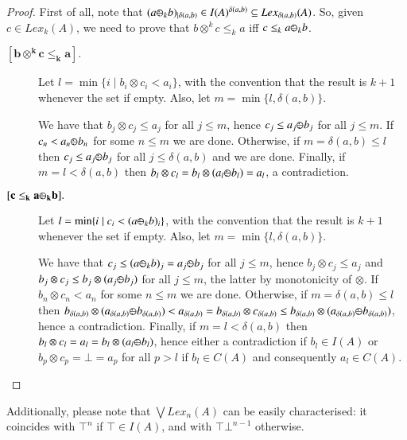 \documentclass[a4paper]{elsarticle}
\newcommand{\1}{\mathbf{1}}
\def\odiv{{ \ominus\hspace{-8pt}:}\;}
\begin{document}
\begin{proof}
	First of all, note that 
	$(a \odiv_k b)_{\mid \delta(a,b)} \in I(A)^{\delta(a,b)} \subseteq Lex_{\delta(a,b)}(A)$.
	So, given $c \in Lex_k(A)$, we need to prove that
	$b\otimes^k c \leq_k a$ iff $c \leq_k a \odiv_k b$.
	
	\begin{description}
		\item[$\mathbf{[b\otimes^k c \leq_k a].}$]
		Let $l = \min \{ i \mid b_i \otimes c_i < a_i\}$,
		with the convention that the result is $k+1$ whenever the set if empty.
		Also, let $m = \min \{l, \delta(a,b)\}$.
		
		We have that $b_j \otimes c_j \leq a_j$ for all $j \leq m$, hence
		$c_j \leq a_j \odiv b_j $ for all $j \leq m$. 
		If $c_n < a_n \odiv b_n$ for some $n \leq m$
		we are done. 
		Otherwise, if $m = \delta(a,b) \leq l$ then 
		$c_j \leq a_j \odiv b_j $ for all $j \leq \delta(a,b)$ and we are done.
		Finally, if $m = l < \delta(a,b)$ then 
		$b_l \otimes c_l = b_l \otimes (a_l \odiv b_l) = a_l$,
		 a contradiction.
		
		\item[$\mathbf{[c \leq_k a \odiv_k b].}$]
		Let $l = \min \{ i \mid c_i < (a \odiv_k b)_i\}$,
		with the convention that the result is $k+1$ whenever the set if empty.
		Also, let $m = \min \{l, \delta(a,b)\}$.
		
		We have that $c_j \leq (a \odiv_k b)_j = a_j \odiv b_j$ for all $j \leq m$, hence
		$b_j \otimes c_j \leq a_j$ and $b_j \otimes c_j \leq b_j \otimes (a_j \odiv b_j)$ 
		for all $j \leq m$, the latter by monotonicity of $\otimes$.
		If $b_n \otimes c_n < a_n$ for some $n \leq m$
		we are done. 
		Otherwise, if $m = \delta(a,b) \leq l$ then 
		$b_{\delta(a,b)} \otimes (a_{\delta(a,b)} \odiv b_{\delta(a,b)}) <
		a_{\delta(a,b)} = b_{\delta(a,b)} \otimes c_{\delta(a,b)} \leq
		b_{\delta(a,b)} \otimes (a_{\delta(a,b)} \odiv b_{\delta(a,b)})$,
		hence a contradiction.
		Finally, if $m = l < \delta(a,b)$ then 
		$b_l \otimes c_l = a_l = b_l \otimes (a_l \odiv b_l)$, 
		hence either a contradiction
		if $b_l \in I(A)$ or $b_p \otimes c_p = \bot = a_p$ for all $p > l$
		if $b_l \in C(A)$ and consequently $a_l \in C(A)$. \qedhere
	\end{description}
\end{proof}

Additionally, please note that $\bigvee Lex_n(A)$ can be easily characterised: 
it coincides with $\top^n$
if $\top \in I(A)$, and with $\top \bot^{n -1}$ otherwise.
\end{document}
